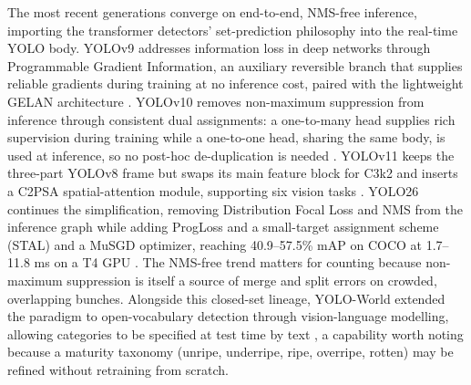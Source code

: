 The most recent generations converge on end-to-end, NMS-free inference, importing the transformer detectors' set-prediction philosophy into the real-time YOLO body. YOLOv9 addresses information loss in deep networks through Programmable Gradient Information, an auxiliary reversible branch that supplies reliable gradients during training at no inference cost, paired with the lightweight GELAN architecture \cite{wang2024yolov9}. YOLOv10 removes non-maximum suppression from inference through consistent dual assignments: a one-to-many head supplies rich supervision during training while a one-to-one head, sharing the same body, is used at inference, so no post-hoc de-duplication is needed \cite{wang2024yolov10}. YOLOv11 keeps the three-part YOLOv8 frame but swaps its main feature block for C3k2 and inserts a C2PSA spatial-attention module, supporting six vision tasks \cite{khanam2024yolov11}. YOLO26 continues the simplification, removing Distribution Focal Loss and NMS from the inference graph while adding ProgLoss and a small-target assignment scheme (STAL) and a MuSGD optimizer, reaching 40.9--57.5\% mAP on COCO at 1.7--11.8 ms on a T4 GPU \cite{sapkota2025yolo26}. The NMS-free trend matters for counting because non-maximum suppression is itself a source of merge and split errors on crowded, overlapping bunches. Alongside this closed-set lineage, YOLO-World extended the paradigm to open-vocabulary detection through vision-language modelling, allowing categories to be specified at test time by text \cite{cheng2024yoloworld}, a capability worth noting because a maturity taxonomy (unripe, underripe, ripe, overripe, rotten) may be refined without retraining from scratch.

